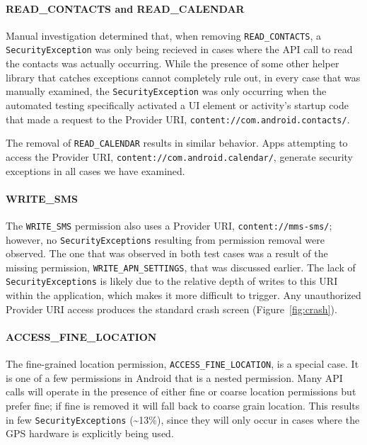 \paragraph{{\bfseries \ttfamily READ\_CONTACTS} and {\bfseries \ttfamily READ\_CALENDAR}}
Manual investigation determined that, when removing \texttt{READ\_CONTACTS}, a \texttt{SecurityException} was only being recieved in cases where the API call to read the contacts was actually occurring. While the presence of some other helper library that catches exceptions cannot completely rule out, in every case that was manually examined, the \texttt{SecurityException} was only occurring when the automated testing specifically activated a UI element or activity's startup code that made a request to the Provider URI, \texttt{content://com.android.contacts/}. 

The removal of \texttt{READ\_CALENDAR} results in similar behavior. Apps attempting to access the Provider URI, \texttt{content://com.android.calendar/}, generate security exceptions in all cases we have examined. 

\paragraph{\bfseries \ttfamily WRITE\_SMS}
The \texttt{WRITE\_SMS} permission also uses a Provider URI, \texttt{content://mms-sms/}; however, no \texttt{SecurityExceptions} resulting from permission removal were observed.  The one that was observed in both test cases was a result of the missing permission, \texttt{WRITE\_APN\_SETTINGS}, that was discussed earlier.  The lack of \texttt{SecurityExceptions} is likely due to the relative depth of writes to this URI within the application, which makes it more difficult to trigger.  Any unauthorized Provider URI access produces the standard crash screen (Figure~\ref{fig:crash}). 

\paragraph{\bfseries \ttfamily ACCESS\_FINE\_LOCATION}
The fine-grained location permission, \texttt{ACCESS\_FINE\_LOCATION}, is a special case. It is one of a few permissions in Android that is a nested permission. Many API calls will operate in the presence of either fine or coarse location permissions but prefer fine; if fine is removed it will fall back to coarse grain location. This results in few \texttt{SecurityExceptions} (\textasciitilde13\%), since they will only occur in cases where the GPS hardware is explicitly being used.

